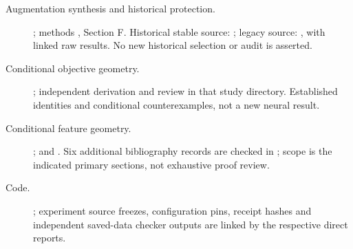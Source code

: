 \documentclass[10pt]{article}
\begin{document}
{\begin{description}
\item[Augmentation synthesis and historical protection.] ; methods , Section F. Historical stable source: ; legacy source: , with linked raw results. No new historical selection or audit is asserted.
\item[Conditional objective geometry.] ; independent derivation  and review  in that study directory. Established identities and conditional counterexamples, not a new neural result.
\item[Conditional feature geometry.] ;  and . Six additional bibliography records are checked in ; scope is the indicated primary sections, not exhaustive proof review.
\item[Code.] ; experiment source freezes, configuration pins, receipt hashes and independent saved-data checker outputs are linked by the respective direct reports.
\end{description}
}


\end{document}
